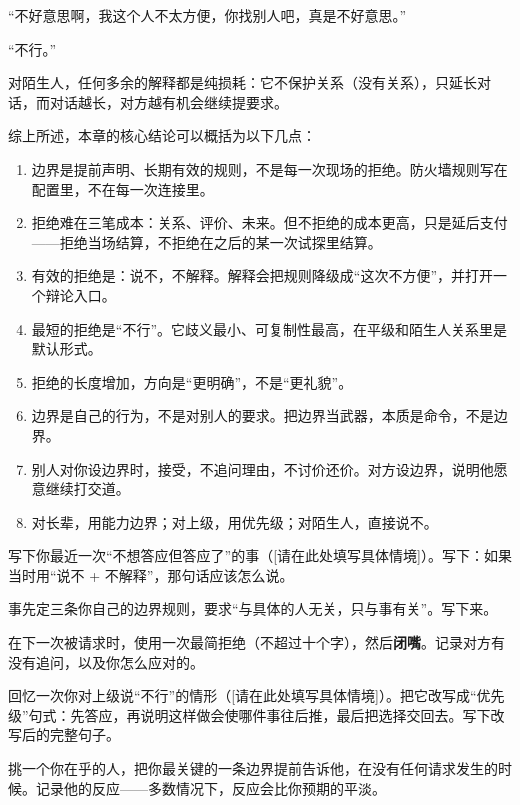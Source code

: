 \begin{mdquote}
“不好意思啊，我这个人不太方便，你找别人吧，真是不好意思。”\par
{}“不行。”
\end{mdquote}

对陌生人，任何多余的解释都是纯损耗：它不保护关系（没有关系），只延长对话，而对话越长，对方越有机会继续提要求。


综上所述，本章的核心结论可以概括为以下几点：

\begin{enumerate}[label=\bfseries\arabic*., leftmargin=2.4em, labelsep=0.7em,
                  itemsep=0.45em, topsep=0.2em, parsep=0.2em]
\item 边界是提前声明、长期有效的规则，不是每一次现场的拒绝。防火墙规则写在配置里，不在每一次连接里。
\item 拒绝难在三笔成本：关系、评价、未来。但不拒绝的成本更高，只是延后支付——拒绝当场结算，不拒绝在之后的某一次试探里结算。
\item 有效的拒绝是：说不，不解释。解释会把规则降级成“这次不方便”，并打开一个辩论入口。
\item 最短的拒绝是“不行”。它歧义最小、可复制性最高，在平级和陌生人关系里是默认形式。
\item 拒绝的长度增加，方向是“更明确”，不是“更礼貌”。
\item 边界是自己的行为，不是对别人的要求。把边界当武器，本质是命令，不是边界。
\item 别人对你设边界时，接受，不追问理由，不讨价还价。对方设边界，说明他愿意继续打交道。
\item 对长辈，用能力边界；对上级，用优先级；对陌生人，直接说不。
\end{enumerate}

\begin{exercisessec}
\item 写下你最近一次“不想答应但答应了”的事（[请在此处填写具体情境]）。写下：如果当时用“说不 + 不解释”，那句话应该怎么说。

\item 事先定三条你自己的边界规则，要求“与具体的人无关，只与事有关”。写下来。

\item 在下一次被请求时，使用一次最简拒绝（不超过十个字），然后\textbf{闭嘴}。记录对方有没有追问，以及你怎么应对的。

\item 回忆一次你对上级说“不行”的情形（[请在此处填写具体情境]）。把它改写成“优先级”句式：先答应，再说明这样做会使哪件事往后推，最后把选择交回去。写下改写后的完整句子。

\item 挑一个你在乎的人，把你最关键的一条边界提前告诉他，在没有任何请求发生的时候。记录他的反应——多数情况下，反应会比你预期的平淡。
\end{exercisessec}

